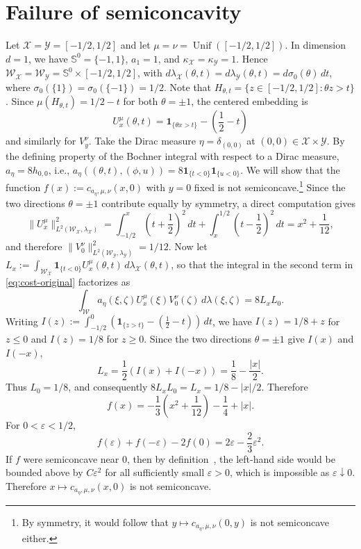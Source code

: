 \documentclass[11pt]{amsart}
\theoremstyle{definition}
\theoremstyle{remark}
\newcommand{\1}{\mathbf{1}}
\newcommand{\Sd}{\mathbb{S}}
\numberwithin{equation}{section}
\begin{document}
\section{Failure of semiconcavity}
\label{app:semiconcavity}
\label{ex:failure-semiconcavity}
Let $\mathcal X=\mathcal Y=[-1/2,1/2]$ and let $\mu=\nu=\operatorname{Unif}([-1/2,1/2])$. In dimension $d=1$, we have $\Sd^0=\{-1,1\}$, $a_1=1$, and $\kappa_{\mathcal X}=\kappa_{\mathcal Y}=1$. Hence $\mathcal W_{\mathcal X}=\mathcal W_{\mathcal Y}=\Sd^0\times[-1/2,1/2]$, with $d\lambda_{\mathcal X}(\theta,t)=d\lambda_{\mathcal Y}(\theta,t)=d\sigma_0(\theta)\,dt$, where $\sigma_0(\{1\})=\sigma_0(\{-1\})=1/2$. Note that $H_{\theta,t}=\{z\in[-1/2,1/2]:\theta z>t\}$. Since $\mu(H_{\theta,t})=1/2-t$ for both $\theta=\pm1$, the centered embedding is
\[
U_x^\mu(\theta,t)=\mathbf 1_{\{\theta x>t\}}-\left(\frac12-t\right)
\]
and similarly for $V_y^\nu$. Take the Dirac measure $\eta=\delta_{(0,0)}$ at $(0,0)\in\mathcal X\times\mathcal Y$. By the defining property of the Bochner integral with respect to a Dirac measure, $a_\eta=8h_{0,0}$, i.e., $a_\eta((\theta,t),(\phi,u))=8\mathbf 1_{\{t<0\}}\mathbf 1_{\{u<0\}}$. We will show that the function $f(x):=c_{a_\eta,\mu,\nu}(x,0)$ with $y=0$ fixed is not semiconcave.\footnote{By symmetry, it would follow that $y\mapsto c_{a_\eta,\mu,\nu}(0,y)$ is not semiconcave either.} Since the two directions $\theta=\pm1$ contribute equally by symmetry, a direct computation gives
\[
\|U_x^\mu\|_{L^2(\mathcal W_{\mathcal X},\lambda_{\mathcal X})}^2
=
\int_{-1/2}^{x}
\left(t+\frac12\right)^2\,dt
+
\int_x^{1/2}
\left(t-\frac12\right)^2\,dt
=
x^2+\frac1{12},
\]
and therefore $\|V_0^\nu\|_{L^2(\mathcal W_{\mathcal Y},\lambda_{\mathcal Y})}^2=1/12$. Now let $L_x:=\int_{\mathcal W_{\mathcal X}}\mathbf 1_{\{t<0\}}U_x^\mu(\theta,t)\,d\lambda_{\mathcal X}(\theta,t)$, so that the integral in the second term in \eqref{eq:cost-original} factorizes as
\[
\int_{\mathcal W}
a_\eta(\xi,\zeta)U_x^\mu(\xi)V_0^\nu(\zeta)\,d\lambda(\xi,\zeta)
=
8L_xL_0.
\]
Writing $I(z):=\int_{-1/2}^{0}\left(\mathbf 1_{\{z>t\}}-\left(\frac12-t\right)\right)\,dt$, we have $I(z)=1/8+z$ for $z\le0$ and $I(z)=1/8$ for $z\ge0$. Since the two directions $\theta=\pm1$ give $I(x)$ and $I(-x)$,
\[
L_x
=
\frac12(I(x)+I(-x))
=
\frac18-\frac{|x|}{2}.
\]
Thus $L_0=1/8$, and consequently $8L_xL_0=L_x=1/8-|x|/2$. Therefore
\[
f(x)
=
-\frac13\left(x^2+\frac1{12}\right)-\frac14+|x|.
\]
For $0<\varepsilon<1/2$,
\[
f(\varepsilon)+f(-\varepsilon)-2f(0)
=
2\varepsilon-\frac23\varepsilon^2.
\]
If $f$ were semiconcave near $0$, then by definition~\cite[Definition~1.1.1]{cannarsa2004semiconcave}, the left-hand side would be bounded above by $C\varepsilon^2$ for all sufficiently small $\varepsilon>0$, which is impossible as $\varepsilon\downarrow0$. Therefore $x\mapsto c_{a_\eta,\mu,\nu}(x,0)$ is not semiconcave.
\end{document}
